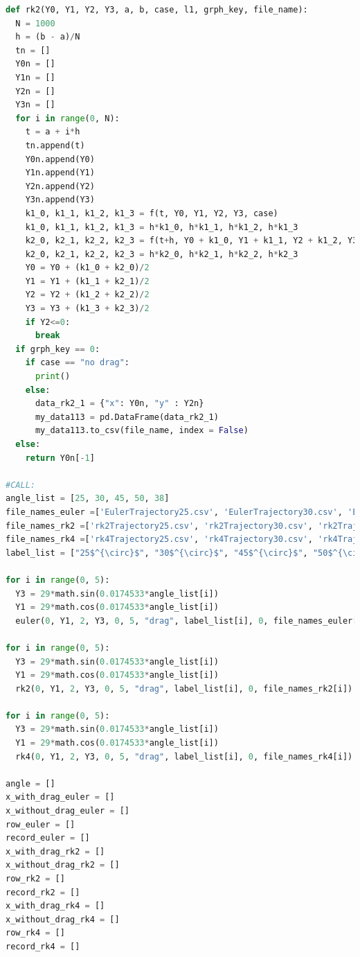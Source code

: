 \documentclass[12pt]{article}
\begin{document}
\begin{lstlisting}[language=Python, caption=Python code]
def rk2(Y0, Y1, Y2, Y3, a, b, case, l1, grph_key, file_name): 
  N = 1000
  h = (b - a)/N
  tn = []
  Y0n = []
  Y1n = []
  Y2n = []
  Y3n = []
  for i in range(0, N):
    t = a + i*h
    tn.append(t)
    Y0n.append(Y0)
    Y1n.append(Y1)
    Y2n.append(Y2)
    Y3n.append(Y3)
    k1_0, k1_1, k1_2, k1_3 = f(t, Y0, Y1, Y2, Y3, case)
    k1_0, k1_1, k1_2, k1_3 = h*k1_0, h*k1_1, h*k1_2, h*k1_3
    k2_0, k2_1, k2_2, k2_3 = f(t+h, Y0 + k1_0, Y1 + k1_1, Y2 + k1_2, Y3 + k1_3, case)
    k2_0, k2_1, k2_2, k2_3 = h*k2_0, h*k2_1, h*k2_2, h*k2_3
    Y0 = Y0 + (k1_0 + k2_0)/2
    Y1 = Y1 + (k1_1 + k2_1)/2
    Y2 = Y2 + (k1_2 + k2_2)/2
    Y3 = Y3 + (k1_3 + k2_3)/2
    if Y2<=0:
      break   
  if grph_key == 0:
    if case == "no drag":
      print()
    else:
      data_rk2_1 = {"x": Y0n, "y" : Y2n}
      my_data113 = pd.DataFrame(data_rk2_1)
      my_data113.to_csv(file_name, index = False)
  else:
    return Y0n[-1]

#CALL:
angle_list = [25, 30, 45, 50, 38]
file_names_euler =['EulerTrajectory25.csv', 'EulerTrajectory30.csv', 'EulerTrajectory45.csv', 'EulerTrajectory50.csv', 'EulerTrajectory38.csv']
file_names_rk2 =['rk2Trajectory25.csv', 'rk2Trajectory30.csv', 'rk2Trajectory45.csv', 'rk2Trajectory50.csv', 'rk2Trajectory38.csv']
file_names_rk4 =['rk4Trajectory25.csv', 'rk4Trajectory30.csv', 'rk4Trajectory45.csv', 'rk4Trajectory50.csv', 'rk4Trajectory38.csv']
label_list = ["25$^{\circ}$", "30$^{\circ}$", "45$^{\circ}$", "50$^{\circ}$", "38$^{\circ}$"]

for i in range(0, 5):
  Y3 = 29*math.sin(0.0174533*angle_list[i])
  Y1 = 29*math.cos(0.0174533*angle_list[i])
  euler(0, Y1, 2, Y3, 0, 5, "drag", label_list[i], 0, file_names_euler[i])

for i in range(0, 5):
  Y3 = 29*math.sin(0.0174533*angle_list[i])
  Y1 = 29*math.cos(0.0174533*angle_list[i])
  rk2(0, Y1, 2, Y3, 0, 5, "drag", label_list[i], 0, file_names_rk2[i])

for i in range(0, 5):
  Y3 = 29*math.sin(0.0174533*angle_list[i])
  Y1 = 29*math.cos(0.0174533*angle_list[i])
  rk4(0, Y1, 2, Y3, 0, 5, "drag", label_list[i], 0, file_names_rk4[i])

angle = []
x_with_drag_euler = []
x_without_drag_euler = []
row_euler = []
record_euler = []
x_with_drag_rk2 = []
x_without_drag_rk2 = []
row_rk2 = []
record_rk2 = []
x_with_drag_rk4 = []
x_without_drag_rk4 = []
row_rk4 = []
record_rk4 = []


\end{lstlisting}
\end{document}

